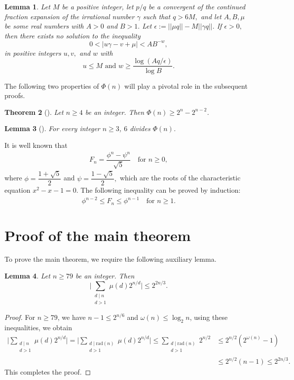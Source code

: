 \documentclass[10pt,a4paper]{amsart}
\newtheorem{theorem}{Theorem}[section]
\newtheorem{lemma} [theorem]{Lemma}
\begin{document}
\begin{lemma}\label{Lem1}Let $M$ be a positive integer, let $p/q$ be a convergent of the
continued fraction expansion of the irrational number $\gamma $ such that $q>6M,$ and
let $A,B,\mu $ be some real numbers with $A>0$ and $B>1.$ Let $\epsilon
:=||\mu q||-M||\gamma q||.$ If $\epsilon >0,$ then there exists no solution
to the inequality 
$$
0<|u\gamma -v+\mu |<AB^{-w}, 
$$
in positive integers $u,v,$ and $w$ with 
$$
u\leq M\text{ and }w\geq \frac{\log (Aq/\epsilon )}{\log B}. 
$$
\end{lemma}


The following two properties of $\Phi(n)$ will play a pivotal role in the subsequent proofs.
\begin{theorem}[\cite{Tmm}]\label{thm for bound}
    Let $n\geq 4$ be an integer. Then $\Phi(n)\geq2^{n}-2^{n-2}$.
\end{theorem}
\begin{lemma}[\cite{T1,Tmm}]\label{Lemma 1} For every integer $n\geq3$, $6$ divides $ \Phi(n)$.  
\end{lemma}
It is well known that 
\begin{align*}\label{eq2}
F_{n}=\dfrac{\phi ^{n}-\psi ^{n}}{\sqrt{5}}   \quad \text{for  } n\geq0, \tag{2}
\end{align*}
where $\phi =\dfrac{1+\sqrt{5}}{2}$ and $\psi =\dfrac{1-\sqrt{5}}{2},$ which are the roots of the characteristic equation $x^{2}-x-1=0$. The following inequality can be proved by induction:
\begin{align*}\label{eq3}
    \phi ^{n-2}\leq F_{n}\leq \phi ^{n-1}  \quad \text{for  } n\geq1.\tag{3}
\end{align*}
\section{Proof of the main theorem}
To prove the main theorem, we require the following auxiliary lemma.
\begin{lemma}\label{Lemma 2} Let $n\geq 79$ be an integer. Then
$$\bigg| \sum_{\substack{d \mid n\\d>1}} \mu(d) 2^{n/d}\bigg|\leq 2^{2n/3}.$$    
\end{lemma}
\begin{proof} For $n\geq79$, we have $n-1\leq 2^{n/6}$ and $\omega(n)\leq \log_2n$, using these inequalities, we obtain
\begin{align*}
   \bigg| \sum_{\substack{d \mid n\\d>1}} \mu(d) 2^{n/d}\bigg|=\bigg|\sum_{\substack{d\mid \text{rad}(n)\\d>1}}\mu(d)2^{n/d}\bigg|\leq \sum_{\substack{d\mid \text{rad}(n)\\d>1}}2^{n/2}
   &\leq 2^{n/2}(2^{\omega(n)}-1)\\&\leq 2^{n/2}(n-1)\leq 2^{2n/3}.
\end{align*}
This completes the proof.
\end{proof}
\end{document}
